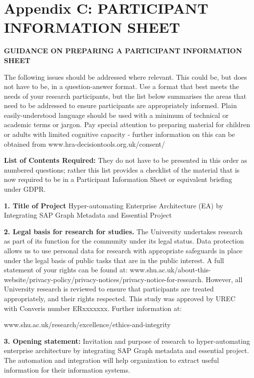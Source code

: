 \documentclass{article}
\begin{document}
\section{Appendix C: PARTICIPANT INFORMATION SHEET}

\textbf{GUIDANCE ON PREPARING A PARTICIPANT INFORMATION SHEET}

The following issues should be addressed where relevant. This could be, but does not have to be, in a question-answer format. Use a format that best meets the needs of your research participants, but the list below summarises the areas that need to be addressed to ensure participants are appropriately informed. Plain easily-understood language should be used with a minimum of technical or academic terms or jargon. Pay special attention to preparing material for children or adults with limited cognitive capacity - further information on this can be obtained from www.hra-decisiontools.org.uk/consent/

\textbf{List of Contents Required:} They do not have to be presented in this order as numbered questions; rather this list provides a checklist of the material that is now required to be in a Participant Information Sheet or equivalent briefing under GDPR. 

\textbf{1.	Title of Project} Hyper-automating Enterprise Architecture (EA) by Integrating SAP Graph Metadata and Essential Project

\textbf{2.	Legal basis for research for studies.}
The University undertakes research as part of its function for the community under its legal status. Data protection allows us to use personal data for research with appropriate safeguards in place under the legal basis of public tasks that are in the public interest.  A full statement of your rights can be found at: www.shu.ac.uk/about-this-website/privacy-policy/privacy-notices/privacy-notice-for-research. However, all University research is reviewed to ensure that participants are treated appropriately, and their rights respected. This study was approved by UREC with Converis number ERxxxxxxx. Further information at: 

www.shu.ac.uk/research/excellence/ethics-and-integrity 


\textbf{3.	Opening statement:} Invitation and purpose of research to hyper-automating enterprise architecture by integrating SAP Graph metadata and essential project. The automation and integration will help organization to extract useful information for their information systems.
\end{document}
